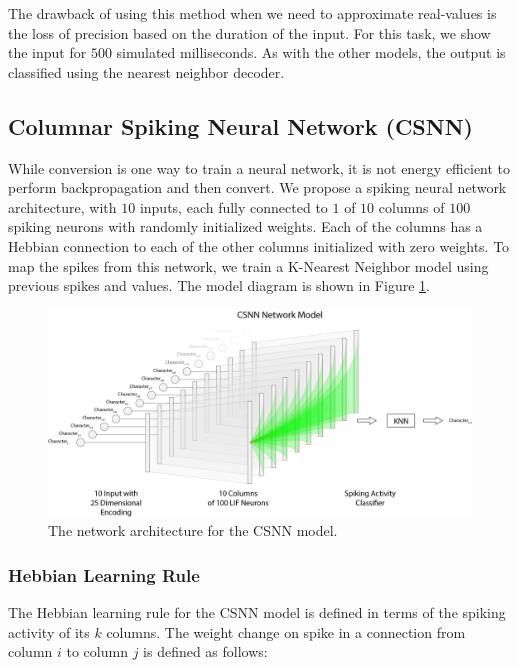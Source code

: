\documentclass{article}
\begin{document}
The drawback of using this method when we need to approximate real-values is the loss of precision based on the duration of the input. For this task, we show the input for $500$ simulated milliseconds. As with the other models, the output is classified using the nearest neighbor decoder.


\subsection*{Columnar Spiking Neural Network (CSNN)}

While conversion is one way to train a neural network, it is not energy efficient to perform backpropagation and then convert. We propose a spiking neural network architecture, with $10$ inputs, each fully connected to $1$ of $10$ columns of $100$ spiking neurons with randomly initialized weights. Each of the columns has a Hebbian connection to each of the other columns initialized with zero weights. To map the spikes from this network, we train a K-Nearest Neighbor model using previous spikes and values. \cite{beliaev2007time} The model diagram is shown in Figure \ref{fig:csnn-network-diagram}.

\begin{figure}[!h]
    \centering
    \includegraphics[width=0.9\linewidth]{../diagrams/csnn.png}
    \caption{The network architecture for the CSNN model.}
    \label{fig:csnn-network-diagram}
\end{figure}

\subsubsection*{Hebbian Learning Rule}
The Hebbian learning rule for the CSNN model is defined in terms of the spiking activity of its $k$ columns. The weight change on spike in a connection from column $i$ to column $j$ is defined as follows:
\end{document}
